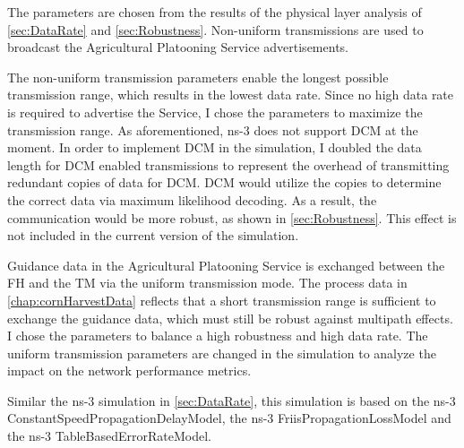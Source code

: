 The parameters are chosen from the results of the physical layer analysis of \autoref{sec:DataRate} and \autoref{sec:Robustness}.
Non-uniform transmissions are used to broadcast the Agricultural Platooning Service advertisements.

The non-uniform transmission parameters enable the longest possible
transmission range, which results in the lowest data rate.
Since no high data rate is required to advertise the Service, I chose the parameters to maximize the transmission range.
As aforementioned, ns-3 does not support \ac{DCM} at the moment.
In order to implement \ac{DCM} in the simulation, I doubled the data length for \ac{DCM} enabled transmissions to
represent the overhead of transmitting redundant copies of data for \ac{DCM}. \ac{DCM} would utilize the copies to determine the
correct data via maximum likelihood decoding.
As a result, the communication would be more robust, as shown in \autoref{sec:Robustness}.
This effect is not included in the current version of the simulation.

Guidance data in the Agricultural Platooning Service is exchanged between the \ac{FH} and the \ac{TM} via the
uniform transmission mode.
The process data in \autoref{chap:cornHarvestData} reflects that a short transmission range
is sufficient to exchange the guidance data, which must still be robust against multipath effects.
I chose the parameters to balance a high robustness and high data rate.
The uniform transmission parameters are changed in the simulation to analyze the impact on the network performance metrics.

Similar the ns-3 simulation in \autoref{sec:DataRate}, this simulation is based on the ns-3 ConstantSpeedPropagationDelayModel, the ns-3 FriisPropagationLossModel and
the ns-3 TableBasedErrorRateModel.

